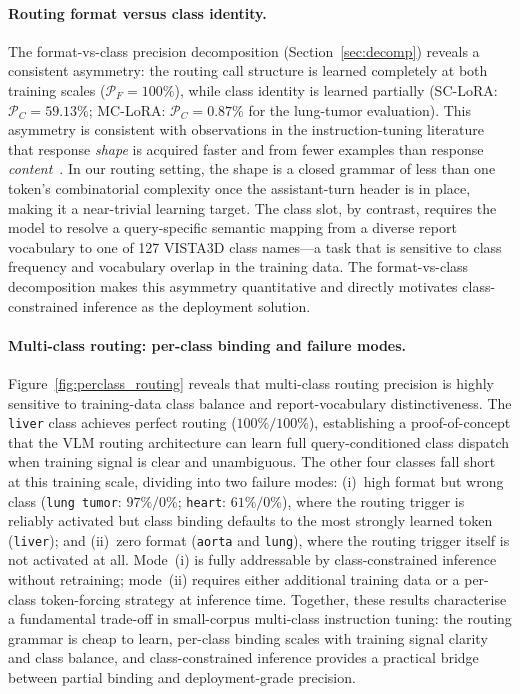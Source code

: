 \documentclass[lineno,referee,pdflatex,sn-mathphys-num]{sn-jnl}
\begin{document}
\paragraph{Routing format versus class identity.}
The format-vs-class precision decomposition (Section~\ref{sec:decomp})
reveals a consistent asymmetry: the routing call structure is learned
completely at both training scales ($\mathcal{P}_F = 100\%$), while
class identity is learned partially (SC-LoRA: $\mathcal{P}_C = 59.13\%$;
MC-LoRA: $\mathcal{P}_C = 0.87\%$ for the lung-tumor evaluation).
This asymmetry is consistent with observations in the instruction-tuning
literature that response \emph{shape} is acquired faster and from fewer
examples than response \emph{content}~\cite{ouyang2022}. In our routing
setting, the shape is a closed grammar of less than one token's
combinatorial complexity once the assistant-turn header is in place,
making it a near-trivial learning target. The class slot, by contrast,
requires the model to resolve a query-specific semantic mapping from a
diverse report vocabulary to one of 127 VISTA3D class names---a task
that is sensitive to class frequency and vocabulary overlap in the
training data. The format-vs-class decomposition makes this asymmetry
quantitative and directly motivates class-constrained inference as the
deployment solution.

\paragraph{Multi-class routing: per-class binding and failure modes.}
Figure~\ref{fig:perclass_routing} reveals that multi-class routing
precision is highly sensitive to training-data class balance and
report-vocabulary distinctiveness. The \texttt{liver} class achieves
perfect routing ($100\%/100\%$), establishing a proof-of-concept that
the VLM routing architecture can learn full query-conditioned class
dispatch when training signal is clear and unambiguous. The other four
classes fall short at this training scale, dividing into two failure
modes: (i)~high format but wrong class (\texttt{lung tumor}: $97\%/0\%$;
\texttt{heart}: $61\%/0\%$), where the routing trigger is reliably
activated but class binding defaults to the most strongly learned token
(\texttt{liver}); and (ii)~zero format (\texttt{aorta} and \texttt{lung}),
where the routing trigger itself is not activated at all. Mode~(i) is
fully addressable by class-constrained inference without retraining;
mode~(ii) requires either additional training data or a per-class
token-forcing strategy at inference time. Together, these results
characterise a fundamental trade-off in small-corpus multi-class
instruction tuning: the routing grammar is cheap to learn, per-class
binding scales with training signal clarity and class balance, and
class-constrained inference provides a practical bridge between partial
binding and deployment-grade precision.
\end{document}
